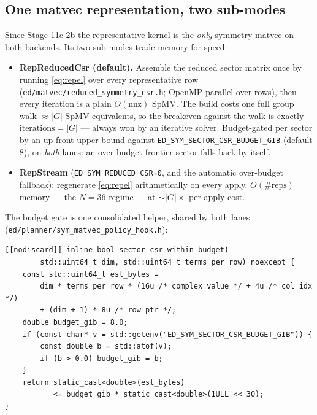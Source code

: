 \documentclass[11pt]{article}
\newcommand{\file}[1]{\texttt{\small #1}}
\begin{document}
\subsection{One matvec representation, two sub-modes}
\label{sec:matvec}

Since Stage 11c-2b the representative kernel is the \emph{only} symmetry
matvec on both backends. Its two sub-modes trade memory for speed:

\begin{itemize}
\item \textbf{RepReducedCsr (default).} Assemble the reduced sector matrix
  once by running \eqref{eq:repel} over every representative row
  (\file{ed/matvec/reduced\_symmetry\_csr.h}; OpenMP-parallel over rows),
  then every iteration is a plain $O(\mathrm{nnz})$ SpMV. The build costs
  one full group walk $\approx |G|$ SpMV-equivalents, so the breakeven
  against the walk is exactly $\text{iterations} = |G|$ --- always won by
  an iterative solver. Budget-gated per sector by an up-front upper bound
  against \texttt{ED\_SYM\_SECTOR\_CSR\_BUDGET\_GIB} (default 8), on
  \emph{both} lanes: an over-budget frontier sector falls back by itself.
\item \textbf{RepStream} (\texttt{ED\_SYM\_REDUCED\_CSR=0}, and the
  automatic over-budget fallback): regenerate \eqref{eq:repel} arithmetically
  on every apply. $O(\#\text{reps})$ memory --- the $N=36$ regime --- at
  $\sim|G|\times$ per-apply cost.
\end{itemize}

The budget gate is one consolidated helper, shared by both lanes
(\file{ed/planner/sym\_matvec\_policy\_hook.h}):

\begin{lstlisting}
[[nodiscard]] inline bool sector_csr_within_budget(
        std::uint64_t dim, std::uint64_t terms_per_row) noexcept {
    const std::uint64_t est_bytes =
        dim * terms_per_row * (16u /* complex value */ + 4u /* col idx */)
        + (dim + 1) * 8u /* row ptr */;
    double budget_gib = 8.0;
    if (const char* v = std::getenv("ED_SYM_SECTOR_CSR_BUDGET_GIB")) {
        const double b = std::atof(v);
        if (b > 0.0) budget_gib = b;
    }
    return static_cast<double>(est_bytes)
           <= budget_gib * static_cast<double>(1ULL << 30);
}
\end{lstlisting}
\end{document}
